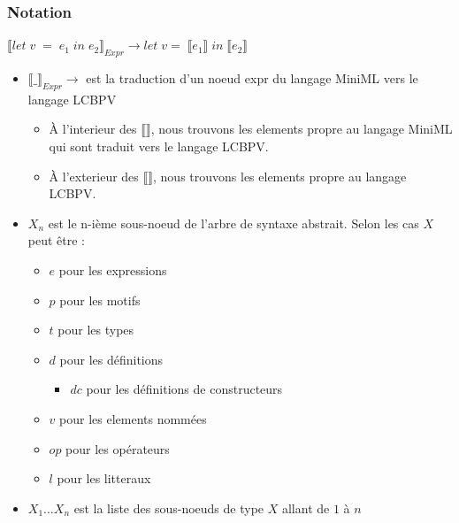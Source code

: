 \documentclass[12pt]{article}
\begin{document}
\newcommand{\translateNode}[2]{\llbracket #1 \rrbracket_{#2}}
\newcommand{\translateResult}[1]{\llbracket #1 \rrbracket}
\newcommand{\isElemMiniML}[1]{\; \textcolor{Maroon}{#1} \;}
\newcommand{\isElemLCBPV}[1]{\textcolor{ForestGreen}{#1}}
\newcommand{\spaced}[1]{\; #1 \;}
\newcommand{\Tab}{\quad \quad \quad \quad \quad \quad \;}
\hypertarget{notation}{%
      \subsubsection*{Notation}\label{notation}}
$ \translateNode{let \; v \; = \; e_1 \; in \; e_2}{Expr}  \rightarrow let \; v = \; \translateResult{e_1} \; in \; \translateResult{e_2}$
\begin{itemize}
      \tightlist
      \item
            $\translateNode{\_}{Expr}  \rightarrow $ est la traduction d'un noeud expr du langage MiniML vers le langage LCBPV
            \begin{itemize}
                  \tightlist
                  \item
                        À l'interieur des $\translateResult{}$, nous trouvons les elements propre au langage MiniML qui sont traduit vers le langage LCBPV.
                  \item
                        À l'exterieur des $\translateResult{}$, nous trouvons les elements propre au langage LCBPV.
            \end{itemize}
      \item
            $X_n$ est le n-ième sous-noeud de l'arbre de syntaxe abstrait. \newline
            Selon les cas $X$ peut être :
            \begin{itemize}
                  \tightlist
                  \item
                        $e$ pour les expressions
                  \item
                        $p$ pour les motifs
                  \item
                        $t$ pour les types
                  \item
                        $d$ pour les définitions
                        \begin{itemize}
                              \tightlist
                              \item
                                    $dc$ pour les définitions de constructeurs
                        \end{itemize}
                  \item
                        $v$ pour les elements nommées
                  \item
                        $op$ pour les opérateurs
                  \item
                        $l$ pour les litteraux
            \end{itemize}
      \item
            $X_1 \dots X_n$ est la liste des sous-noeuds de type $X$ allant de $1$ à $n$
\end{itemize}
\end{document}
